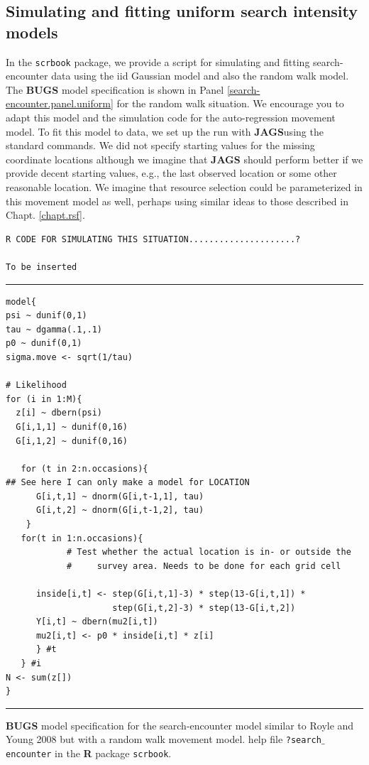 \subsection{Simulating and fitting uniform search intensity models}

In the \mbox{\tt scrbook} package, we provide a script for simulating
and fitting search-encounter data using the iid Gaussian model and
also the random walk model. 
 The {\bf BUGS} model specification is shown in
Panel \ref{search-encounter.panel.uniform} for the random walk
situation. We encourage you to adapt this model and the simulation
code for the
auto-regression movement model. 
To fit this model to data, 
we set
up the run with {\bf JAGS}using the standard commands. We did not specify
starting values for the missing coordinate locations although we
imagine that {\bf JAGS} should perform better if we provide decent starting
values, e.g., the last observed location or some other reasonable location.
 We imagine that resource selection  could
be parameterized in this movement model as well, perhaps
using similar ideas to those described in Chapt. \ref{chapt.rsf}. 

\begin{verbatim}
R CODE FOR SIMULATING THIS SITUATION.....................?

To be inserted
\end{verbatim}


\begin{panel}[htp]
\centering
\rule[0.15in]{\textwidth}{.03in}
{\small
\begin{verbatim}
model{
psi ~ dunif(0,1)
tau ~ dgamma(.1,.1)
p0 ~ dunif(0,1)
sigma.move <- sqrt(1/tau)

# Likelihood
for (i in 1:M){
  z[i] ~ dbern(psi)
  G[i,1,1] ~ dunif(0,16)
  G[i,1,2] ~ dunif(0,16)

   for (t in 2:n.occasions){
## See here I can only make a model for LOCATION
      G[i,t,1] ~ dnorm(G[i,t-1,1], tau)
      G[i,t,2] ~ dnorm(G[i,t-1,2], tau)
    }
   for(t in 1:n.occasions){
            # Test whether the actual location is in- or outside the 
            #     survey area. Needs to be done for each grid cell

      inside[i,t] <- step(G[i,t,1]-3) * step(13-G[i,t,1]) *
                     step(G[i,t,2]-3) * step(13-G[i,t,2])
      Y[i,t] ~ dbern(mu2[i,t])
      mu2[i,t] <- p0 * inside[i,t] * z[i]
      } #t
   } #i
N <- sum(z[])
}
\end{verbatim}
}
\rule[-0.15in]{\textwidth}{.03in}
\caption{
{\bf BUGS} model specification for the search-encounter model similar
to Royle and Young 2008 but with a random walk movement model.
help file \mbox{\tt ?search$\_$encounter} in the {\bf R} package \mbox{\tt scrbook}.
}
\label{search-encounter.panel.uniform}
\end{panel}

